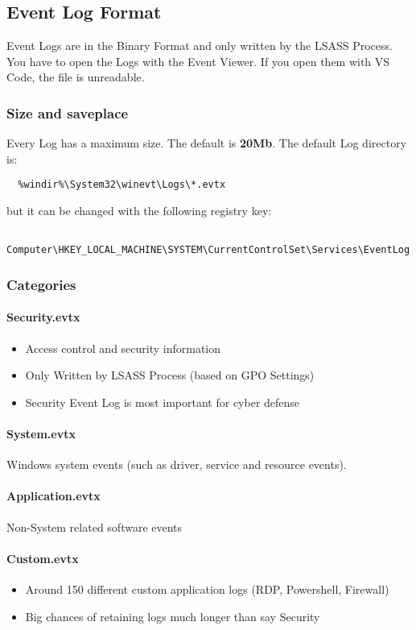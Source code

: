 \subsection{Event Log Format}
Event Logs are in the Binary Format and only written by the LSASS Process.
You have to open the Logs with the Event Viewer. If you open them with VS Code, the file is unreadable.\\

\subsubsection{Size and saveplace}
Every Log has a maximum size. The default is \textbf{20Mb}.
The default Log directory is: 
\begin{lstlisting}
  %windir%\System32\winevt\Logs\*.evtx
\end{lstlisting}
but it can be changed with the following registry key:
\begin{lstlisting}
  Computer\HKEY_LOCAL_MACHINE\SYSTEM\CurrentControlSet\Services\EventLog
\end{lstlisting}

\subsubsection{Categories}

\paragraph{Security.evtx}
\begin{itemize}
  \item Access control and security information
  \item Only Written by LSASS Process (based on GPO Settings)
  \item Security Event Log is most important for cyber defense
\end{itemize}

\paragraph{System.evtx}
Windows system events (such as driver, service and resource events).

\paragraph{Application.evtx}
Non-System related software events

\paragraph{Custom.evtx}
\begin{itemize}
  \item Around 150 different custom application logs (RDP, Powershell, Firewall)
  \item Big chances of retaining logs much longer than say Security
\end{itemize}

